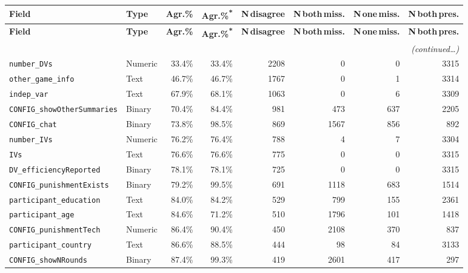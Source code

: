 \documentclass[11pt,a4paper]{article}
\begin{document}
\begin{center}
\small
\begin{longtable}{llrrrrrr}
\toprule
\textbf{Field} & \textbf{Type} & \textbf{Agr.\%} & \textbf{Agr.\%\textsuperscript{*}} & \textbf{N\,disagree} & \textbf{N\,both\,miss.} & \textbf{N\,one\,miss.} & \textbf{N\,both\,pres.}\\
\midrule
\endfirsthead
\toprule
\textbf{Field} & \textbf{Type} & \textbf{Agr.\%} & \textbf{Agr.\%\textsuperscript{*}} & \textbf{N\,disagree} & \textbf{N\,both\,miss.} & \textbf{N\,one\,miss.} & \textbf{N\,both\,pres.}\\
\midrule
\endhead
\midrule \multicolumn{8}{r}{\small\itshape (continued\ldots)} \\
\endfoot
\bottomrule
\endlastfoot
\rowcolor{red!18} \texttt{number\_DVs} & Numeric & 33.4\% & 33.4\% & 2208 & 0 & 0 & 3315\\
\rowcolor{red!18} \texttt{other\_game\_info} & Text & 46.7\% & 46.7\% & 1767 & 0 & 1 & 3314\\
\rowcolor{orange!28} \texttt{indep\_var} & Text & 67.9\% & 68.1\% & 1063 & 0 & 6 & 3309\\
\rowcolor{orange!28} \texttt{CONFIG\_showOtherSummaries} & Binary & 70.4\% & 84.4\% & 981 & 473 & 637 & 2205\\
\rowcolor{orange!28} \texttt{CONFIG\_chat} & Binary & 73.8\% & 98.5\% & 869 & 1567 & 856 & 892\\
\rowcolor{orange!28} \texttt{number\_IVs} & Numeric & 76.2\% & 76.4\% & 788 & 4 & 7 & 3304\\
\rowcolor{orange!28} \texttt{IVs} & Text & 76.6\% & 76.6\% & 775 & 0 & 0 & 3315\\
\rowcolor{orange!28} \texttt{DV\_efficiencyReported} & Binary & 78.1\% & 78.1\% & 725 & 0 & 0 & 3315\\
\rowcolor{orange!28} \texttt{CONFIG\_punishmentExists} & Binary & 79.2\% & 99.5\% & 691 & 1118 & 683 & 1514\\
\rowcolor{green!18} \texttt{participant\_education} & Text & 84.0\% & 84.2\% & 529 & 799 & 155 & 2361\\
\rowcolor{green!18} \texttt{participant\_age} & Text & 84.6\% & 71.2\% & 510 & 1796 & 101 & 1418\\
\rowcolor{green!18} \texttt{CONFIG\_punishmentTech} & Numeric & 86.4\% & 90.4\% & 450 & 2108 & 370 & 837\\
\rowcolor{green!18} \texttt{participant\_country} & Text & 86.6\% & 88.5\% & 444 & 98 & 84 & 3133\\
\rowcolor{green!18} \texttt{CONFIG\_showNRounds} & Binary & 87.4\% & 99.3\% & 419 & 2601 & 417 & 297\\

\end{longtable}
\end{center}
\end{document}
